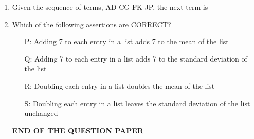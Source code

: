 \documentclass[journal,12pt,onecolumn]{IEEEtran}
\theoremstyle{remark}
\begin{document}
\begin{enumerate}
\item Given the sequence of terms, AD CG FK JP, the next term is
\hfill{}
\begin{enumerate}
\end{enumerate}

\item Which of the following assertions are CORRECT?
\begin{itemize}
    \item[P:] Adding 7 to each entry in a list adds 7 to the mean of the list
    \item[Q:] Adding 7 to each entry in a list adds 7 to the standard deviation of the list
    \item[R:] Doubling each entry in a list doubles the mean of the list
    \item[S:] Doubling each entry in a list leaves the standard deviation of the list unchanged
    \hfill{}
\end{itemize}
\begin{enumerate}
\end{enumerate}
\centering
\textbf{END OF THE QUESTION PAPER}


\end{enumerate}
\end{document}

